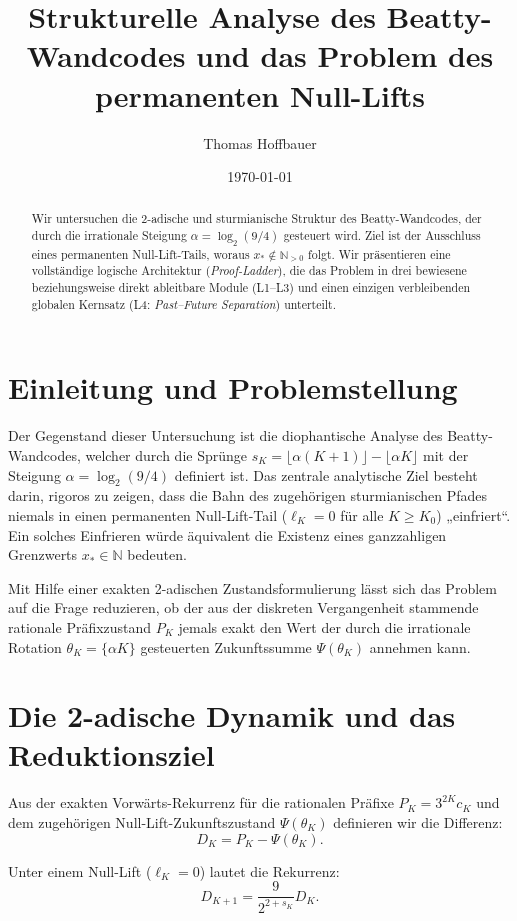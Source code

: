 \documentclass[11pt,a4paper]{article}
\title{Strukturelle Analyse des Beatty-Wandcodes und das Problem des permanenten Null-Lifts}
\author{Thomas Hoffbauer}
\date{\today}
\begin{document}
\maketitle

\begin{abstract}
Wir untersuchen die 2-adische und sturmianische Struktur des Beatty-Wandcodes, der durch die irrationale Steigung $\alpha = \log_2(9/4)$ gesteuert wird. Ziel ist der Ausschluss eines permanenten Null-Lift-Tails, woraus $x_* \notin \mathbb{N}_{>0}$ folgt. Wir präsentieren eine vollständige logische Architektur (\emph{Proof-Ladder}), die das Problem in drei bewiesene beziehungsweise direkt ableitbare Module (L1--L3) und einen einzigen verbleibenden globalen Kernsatz (L4: \emph{Past--Future Separation}) unterteilt.
\end{abstract}

\section{Einleitung und Problemstellung}

Der Gegenstand dieser Untersuchung ist die diophantische Analyse des Beatty-Wandcodes, welcher durch die Sprünge $s_K = \lfloor\alpha(K+1)\rfloor - \lfloor\alpha K\rfloor$ mit der Steigung $\alpha = \log_2(9/4)$ definiert ist. Das zentrale analytische Ziel besteht darin, rigoros zu zeigen, dass die Bahn des zugehörigen sturmianischen Pfades niemals in einen permanenten Null-Lift-Tail ($\ell_K = 0$ für alle $K \ge K_0$) „einfriert“. Ein solches Einfrieren würde äquivalent die Existenz eines ganzzahligen Grenzwerts $x_* \in \mathbb{N}$ bedeuten.

Mit Hilfe einer exakten 2-adischen Zustandsformulierung lässt sich das Problem auf die Frage reduzieren, ob der aus der diskreten Vergangenheit stammende rationale Präfixzustand $P_K$ jemals exakt den Wert der durch die irrationale Rotation $\theta_K = \{\alpha K\}$ gesteuerten Zukunftssumme $\Psi(\theta_K)$ annehmen kann.

\section{Die 2-adische Dynamik und das Reduktionsziel}

Aus der exakten Vorwärts-Rekurrenz für die rationalen Präfixe $P_K = 3^{2K} c_K$ und dem zugehörigen Null-Lift-Zukunftszustand $\Psi(\theta_K)$ definieren wir die Differenz:
$$D_K = P_K - \Psi(\theta_K).$$

Unter einem Null-Lift ($\ell_K = 0$) lautet die Rekurrenz:
$$D_{K+1} = \frac{9}{2^{2+s_K}} D_K.$$
\end{document}
